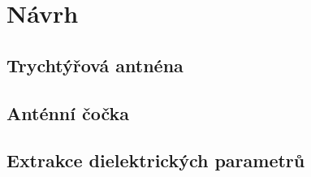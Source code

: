\chapter{Návrh}

\section{Trychtýřová antnéna}

\section{Anténní čočka}

\section{Extrakce dielektrických parametrů}